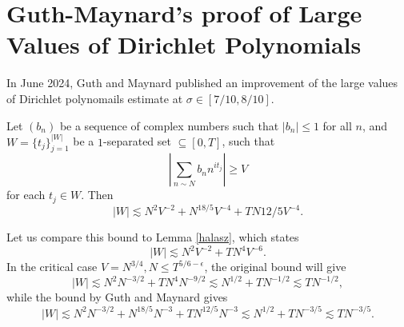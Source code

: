 \section{Guth-Maynard's proof of Large Values of Dirichlet Polynomials}
In June 2024, Guth and Maynard published an improvement of the large values of Dirichlet polynomails estimate at $\sigma\in[7/10,8/10]$.
\begin{theorem}
    Let $(b_n)$ be a sequence of complex numbers such that $|b_n|\leq 1$ for all $n$, and $W=\{t_j\}_{j=1}^{|W|}$ be a $1$-separated set $\subseteq [0,T]$, such that \[
    \left|\sum_{n\sim N}b_n n^{it_j}\right|\geq V
    \]
    for each $t_j\in W$. Then \[
    |W|\lesssim N^2V^{-2}+N^{18/5}V^{-4}+TN{12/5}V^{-4}.
    \]
\end{theorem}
Let us compare this bound to Lemma \ref{halasz}, which states \[
|W|\lesssim N^2V^{-2}+TN^4V^{-6}.
\]
In the critical case $V=N^{3/4}, N\leq T^{5/6-\epsilon}$, the original bound will give \[
|W|\lesssim N^2N^{-3/2}+TN^4N^{-9/2}\lesssim N^{1/2}+ TN^{-1/2}\lesssim TN^{-1/2},
\]
while the bound by Guth and Maynard gives \[
|W|\lesssim N^2N^{-3/2}+N^{18/5}N^{-3}+TN^{12/5}N^{-3}\lesssim N^{1/2}+TN^{-3/5}\lesssim TN^{-3/5}.
\]
